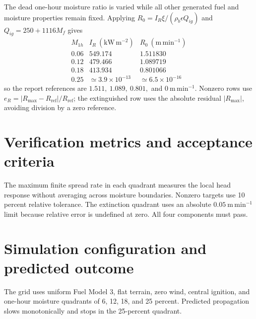 The dead one-hour moisture ratio is varied while all other generated fuel
and moisture properties remain fixed.  Applying
\(R_0=I_R\xi/(\rho_b\epsilon Q_{ig})\) and
\(Q_{ig}=250+1116M_f\) gives
\[
\begin{array}{c|cc}
M_{1h}&I_R~(\mathrm{kW\,m^{-2}})&R_0~(\mathrm{m\,min^{-1}})\\
\hline
0.06&549.174&1.511830\\
0.12&479.466&1.089719\\
0.18&413.934&0.801066\\
0.25&\simeq3.9\times10^{-13}&\simeq6.5\times10^{-16}
\end{array}
\]
so the report references are \(1.511,\ 1.089,\ 0.801,\) and
\(0~\mathrm{m\,min^{-1}}\).  Nonzero rows use
\(e_R=|R_{\max}-R_{\mathrm{ref}}|/R_{\mathrm{ref}}\); the extinguished
row uses the absolute residual \(|R_{\max}|\), avoiding division by a
zero reference.

\section{Verification metrics and acceptance criteria}

The maximum finite spread rate in each quadrant measures the local head response without averaging across moisture boundaries. Nonzero targets use 10 percent relative tolerance. The extinction quadrant uses an absolute \(0.05~\mathrm{m\,min^{-1}}\) limit because relative error is undefined at zero. All four components must pass.

\section{Simulation configuration and predicted outcome}

The grid uses uniform Fuel Model 3, flat terrain, zero wind, central ignition, and one-hour moisture quadrants of 6, 12, 18, and 25 percent. Predicted propagation slows monotonically and stops in the 25-percent quadrant.

